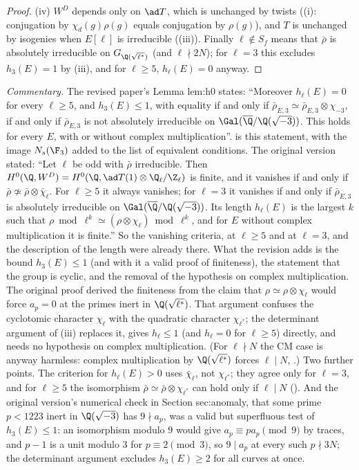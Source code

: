 \begin{proof}
(iv) $W^D$ depends only on $\ad T$, which is unchanged by twists ((i): conjugation by $\chi_d(g)\rho(g)$ equals conjugation by
$\rho(g)$), and $T$ is unchanged by isogenies when $E[\ell]$ is irreducible ((iii)). Finally $\ell\notin S_f$ means that $\bar\rho$ is
absolutely irreducible on $G_{\Q(\sqrt{\ell^*})}$ (and $\ell\nmid2N$); for $\ell=3$ this excludes $h_3(E)=1$ by (iii), and for $\ell\ge5$, $h_\ell(E)=0$ anyway.
\end{proof}

\begin{paperlink}
\emph{Commentary.} The revised paper's Lemma lem:h0 states: ``Moreover $h_\ell(E)=0$ for every $\ell\ge5$, and $h_3(E)\le1$, with equality if and only if
$\bar\rho_{E,3}\simeq\bar\rho_{E,3}\otimes\chi_{-3}$, if and only if $\bar\rho_{E,3}$ is not absolutely irreducible on $\Gal(\overline\Q/\Q(\sqrt{-3}))$. This holds for every
$E$, with or without complex multiplication''.  is this statement, with the image $N_s(\F_3)$ added to the list of equivalent
conditions. The original version stated: ``Let $\ell$ be odd with $\bar\rho$ irreducible. Then $H^0(\Q,W^D)=H^0(\Q,\ad T(1)\otimes\Q_\ell/\Z_\ell)$ is
finite, and it vanishes if and only if $\bar\rho\not\simeq\bar\rho\otimes\bar\chi_\ell$. For $\ell\ge5$ it always vanishes; for $\ell=3$ it vanishes if and only
if $\bar\rho_{E,3}$ is absolutely irreducible on $\Gal(\overline\Q/\Q(\sqrt{-3}))$. Its length $h_\ell(E)$ is the largest $k$ such that
$\rho\bmod\ell^k\simeq(\rho\otimes\chi_\ell)\bmod\ell^k$, and for $E$ without complex multiplication it is finite.'' So the vanishing criteria, at $\ell\ge5$
and at $\ell=3$, and the description of the length were already there. What the revision adds is the bound $h_3(E)\le1$ (and with it a valid proof
of finiteness), the statement that the group is cyclic, and the removal of the hypothesis on complex multiplication. The original proof derived the finiteness from the claim that
$\rho\simeq\rho\otimes\chi_\ell$ would force $a_p=0$ at the primes inert in $\Q(\sqrt{\ell^*})$. That argument confuses the cyclotomic character $\chi_\ell$
with the quadratic character $\chi_{\ell^*}$; the determinant argument of (iii) replaces it, gives $h_\ell\le1$ (and $h_\ell=0$ for $\ell\ge5$) directly,
and needs no hypothesis on complex multiplication. (For $\ell\nmid N$ the CM case is anyway harmless: complex
multiplication by $\Q(\sqrt{\ell^*})$ forces $\ell\mid N$, .) Two further points. The criterion for $h_\ell(E)>0$ uses $\bar\chi_\ell$, not
$\chi_{\ell^*}$; they agree only for $\ell=3$, and for $\ell\ge5$ the isomorphism $\bar\rho\simeq\bar\rho\otimes\chi_{\ell^*}$ can hold only if $\ell\mid N$
(). And the original version's numerical check in Section sec:anomaly, that some prime $p<1223$ inert in
$\Q(\sqrt{-3})$ has $9\nmid a_p$, was a valid but superfluous test of $h_3(E)\le1$: an isomorphism modulo $9$ would give $a_p\equiv pa_p\pmod9$ by traces, and
$p-1$ is a unit modulo $3$ for $p\equiv2\pmod3$, so $9\mid a_p$ at every such $p\nmid3N$; the determinant argument excludes $h_3(E)\ge2$ for all curves at
once.
\end{paperlink}

